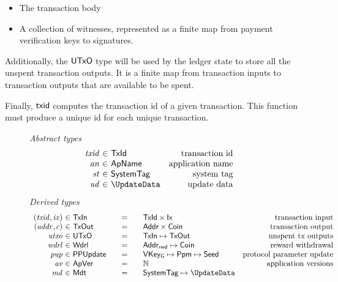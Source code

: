 \begin{itemize}
  \item The transaction body
  \item A collection of witnesses, represented as a finite map from payment verification keys
    to signatures.
\end{itemize}

Additionally, the $\mathsf{UTxO}$ type will be used by the ledger state to store all the
unspent transaction outputs. It is a finite map from transaction inputs
to transaction outputs that are available to be spent.

Finally, $\mathsf{txid}$ computes the transaction id of a given transaction.
This function must produce a unique id for each unique transaction.

\begin{figure*}[htb]
  \emph{Abstract types}
  \begin{equation*}
    \begin{array}{r@{~\in~}lr}
      \var{txid} & \TxId & \text{transaction id}\\
      \var{an} & \ApName & \text{application name}\\
      \var{st} & \SystemTag & \text{system tag}\\
      \var{ud} & \UpdateData & \text{update data}\\
    \end{array}
  \end{equation*}
  \emph{Derived types}
  \begin{equation*}
    \begin{array}{r@{~\in~}l@{\qquad=\qquad}lr}
      (\var{txid}, \var{ix})
      & \TxIn
      & \TxId \times \Ix
      & \text{transaction input}
      \\
      (\var{addr}, c)
      & \type{TxOut}
      & \Addr \times \Coin
      & \text{transaction output}
      \\
      \var{utxo}
      & \UTxO
      & \TxIn \mapsto \TxOut
      & \text{unspent tx outputs}
      \\
      \var{wdrl}
      & \Wdrl
      & \AddrRWD \mapsto \Coin
      & \text{reward withdrawal}
      \\
      \var{pup}
      & \PPUpdate
      & \VKeyGen \mapsto \Ppm \mapsto \Seed
      & \text{protocol parameter update}
      \\
      \var{av}
      & \ApVer
      & \N
      & \text{application versions}
      \\
      \var{md}
      & \Metadata
      & \SystemTag\mapsto\UpdateData

\end{array}
\end{equation*}
\end{figure*}
